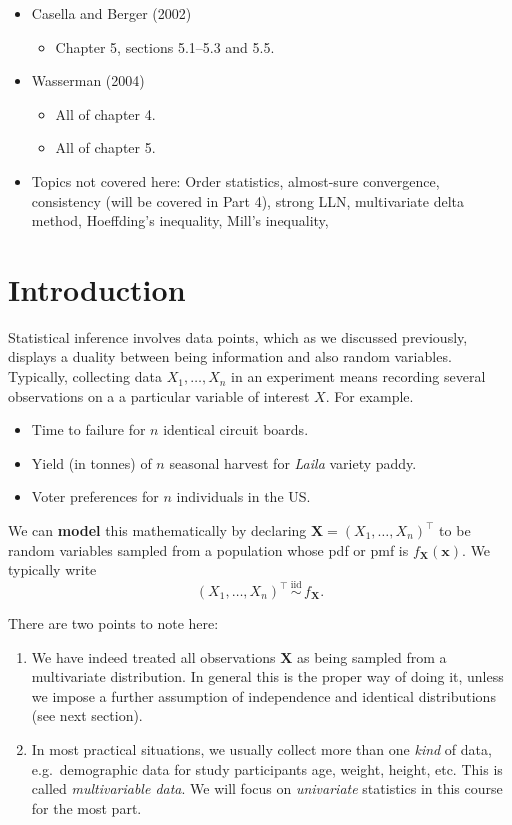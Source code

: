 \documentclass[
]{book}
\providecommand{\tightlist}{%
  \setlength{\itemsep}{0pt}\setlength{\parskip}{0pt}}
\newcommand{\bx}{{\boldsymbol x}}
\newcommand{\bX}{{\boldsymbol X}}
\newcommand{\iid}{\,\overset{\text{iid}}{\sim}\,}
\theoremstyle{definition}
\theoremstyle{definition}
\theoremstyle{definition}
\theoremstyle{definition}
\theoremstyle{remark}
\begin{document}
\begin{itemize}
\tightlist
\item
  Casella and Berger (2002)

  \begin{itemize}
  \tightlist
  \item
    Chapter 5, sections 5.1--5.3 and 5.5.
  \end{itemize}
\item
  Wasserman (2004)

  \begin{itemize}
  \tightlist
  \item
    All of chapter 4.
  \item
    All of chapter 5.
  \end{itemize}
\item
  Topics not covered here: Order statistics, almost-sure convergence, consistency (will be covered in Part 4), strong LLN, multivariate delta method, Hoeffding's inequality, Mill's inequality,
\end{itemize}

\hypertarget{introduction}{%
\section{Introduction}\label{introduction}}

Statistical inference involves data points, which as we discussed previously, displays a duality between being information and also random variables.
Typically, collecting data \(X_1,\dots,X_n\) in an experiment means recording several observations on a a particular variable of interest \(X\).
For example.

\begin{itemize}
\tightlist
\item
  Time to failure for \(n\) identical circuit boards.
\item
  Yield (in tonnes) of \(n\) seasonal harvest for \emph{Laila} variety paddy.
\item
  Voter preferences for \(n\) individuals in the US.
\end{itemize}

We can \textbf{model} this mathematically by declaring \(\bX = (X_1,\dots,X_n)^\top\) to be random variables sampled from a population whose pdf or pmf is \(f_{\bX}(\bx)\).
We typically write
\[
(X_1,\dots,X_n)^\top \iid f_{\bX}.
\]

There are two points to note here:

\begin{enumerate}
\def\labelenumi{\arabic{enumi}.}
\item
  We have indeed treated all observations \(\bX\) as being sampled from a multivariate distribution. In general this is the proper way of doing it, unless we impose a further assumption of independence and identical distributions (see next section).
\item
  In most practical situations, we usually collect more than one \emph{kind} of data, e.g.~demographic data for study participants age, weight, height, etc. This is called \emph{multivariable data}. We will focus on \emph{univariate} statistics in this course for the most part.
\end{enumerate}
\end{document}
